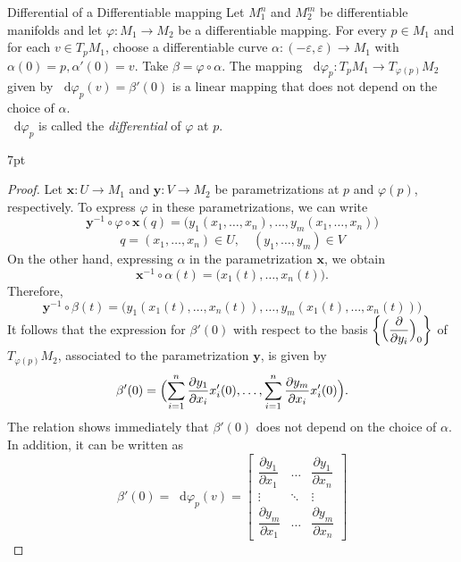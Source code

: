 \documentclass[
	border={25mm 20mm 25mm 30mm},  %
	varwidth,  %
]{standalone}
\newcommand\dd{\mathop{}\!\mathrm{d}}%
\newenvironment{purpleformal}{%
\def\FrameCommand{%
\hspace{1pt}%
{\color{purpleframeshade}\vrule width 2pt}%
{\color{purpleformalshade}\vrule width 4pt}%
\colorbox{purpleformalshade}%
}%
\MakeFramed{\advance\hsize-\width\FrameRestore}%
\noindent\hspace{-4.55pt}%
\begin{adjustwidth}{}{7pt}%
\vspace{1pt}\vspace{1pt}%
}
{%
\vspace{5pt}\end{adjustwidth}\endMakeFramed%
}
\begin{document}
\begin{tips}{Differential of a Differentiable mapping}
    Let \(M_1^n\) and \(M_2^m\) be differentiable manifolds and let \(\varphi:M_1\to M_2\) be a differentiable mapping. For every \(p\in M_1\) and for each \(v\in T_p M_1\), choose a differentiable curve \(\alpha:(-\varepsilon,\varepsilon)\to M_1\) with \(\alpha(0)=p,\alpha'(0)=v\). Take \(\beta=\varphi\circ\alpha\). The mapping \(\dd\varphi_p:T_p M_1\to T_{\varphi(p)}M_2\) given by \(\dd\varphi_p(v)=\beta'(0)\) is a linear mapping that does not depend on the choice of \(\alpha\).
    \\ \(\dd\varphi_p\) is called the \textsl{differential} of \(\varphi\) at \(p\).
\end{tips}

\begin{purpleformal}
    \begin{proof}
        Let \(\mathbf{x}:U\to M_1\) and \(\mathbf{y}:V\to M_2\) be parametrizations at \(p\) and \(\varphi(p)\), respectively. To express \(\varphi\) in these parametrizations, we can write
        \[\mathbf{y}^{-1}\circ\varphi\circ\mathbf{x}(q)=\bigl(y_1(x_1,\dots,x_n),\dots,y_m(x_1,\dots,x_n)\bigr)\]\[
            q=(x_1,\dots,x_n)\in U,\quad (y_1,\dots,y_m)\in V\]
        On the other hand, expressing \(\alpha\) in the parametrization \(\mathbf{x}\), we obtain
        \[\mathbf{x}^{-1}\circ\alpha(t)=\bigl(x_1(t),\dots,x_n(t)\bigr).\]
        Therefore,
        \[\mathbf{y}^{-1}\circ\beta(t)=\bigl(y_1(x_1(t),\dots,x_n(t)),\dots,y_m(x_1(t),\dots,x_n(t))\bigr)\]
        It follows that the expression for \(\beta'(0)\) with respect to the basis \(\left\{\Bigl(\dfrac{\partial}{\partial y_i}\Bigr)_0\right\}\) of \(T_{\varphi(p)}M_2\), associated to the parametrization \(\mathbf{y}\), is given by
        \[\beta'(0)=\Bigl(\sum_{i=1}^{n}{\frac{\partial y_1}{\partial x_i}x_i'(0)},\dots,\sum_{i=1}^{n}{\frac{\partial y_m}{\partial x_i}x_i'(0)}\Bigr).\]
        The relation shows immediately that \(\beta'(0)\) does not depend on the choice of \(\alpha\). In addition, it can be written as
        \[\beta'(0)=\dd \varphi_p(v)
            =\begin{bmatrix}
                \dfrac{\partial y_1}{\partial x_1} & \ldots & \dfrac{\partial y_1}{\partial x_n} \\
                \vdots                             & \ddots & \vdots                             \\
                \dfrac{\partial y_m}{\partial x_1} & \ldots & \dfrac{\partial y_m}{\partial x_n}
            \end{bmatrix}
\]
\end{proof}
\end{purpleformal}
\end{document}
